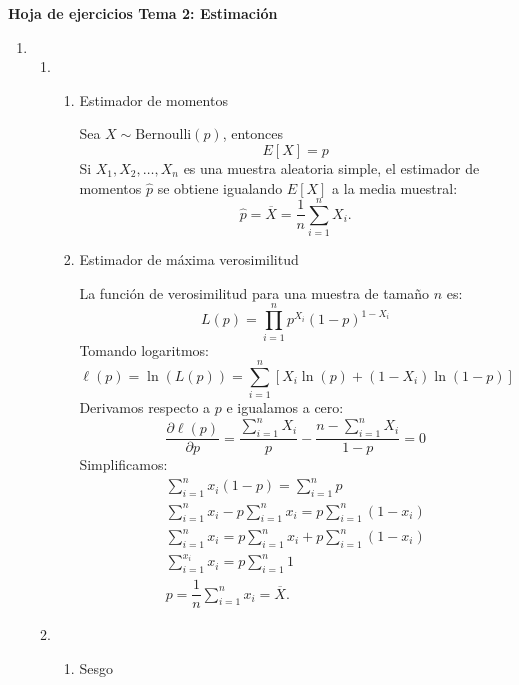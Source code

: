 \begin{center}
    \textbf{\large Hoja de ejercicios Tema 2: Estimación} 
\end{center}
\begin{enumerate}[label=\color{red}\textbf{\arabic*)}]
    \item {}
        \begin{enumerate}[label=\color{red}\textbf{\alph*)}]
            \item {}
                \begin{enumerate}[label=\arabic*)]
                    \item Estimador de momentos

                        Sea $X\sim \mathrm{Bernoulli}(p)$, entonces \[
                            E[X]=p
                        \] 
                        Si $X_1,X_2,\dots,X_n$ es una muestra aleatoria simple, el estimador de momentos  $\hat{p}$ se obtiene igualando $E[X]$ a la media muestral:  \[
                        \hat{p}=\overline{X}=\dfrac{1}{n}\sum_{i=1}^{n} X_i.
                        \] 
                    \item Estimador de máxima verosimilitud

                        La función de verosimilitud para una muestra de tamaño $n$ es: \[
                        L(p)=\prod_{i=1}^{n} p^{X_i}(1-p)^{1-X_i} 
                        \] 
                        Tomando logaritmos: \[
                            \ell(p)=\ln(L(p))=\sum_{i=1}^{n} [X_i\ln(p)+(1-X_i)\ln(1-p)]
                        \] 
                        Derivamos respecto a $p$ e igualamos a cero: \[
                        \frac{\partial \ell(p)}{\partial p} =\dfrac{\sum_{i=1}^{n} X_i}{p}-\dfrac{n-\sum_{i=1}^{n} X_i}{1-p}=0
                        \] 
                        Simplificamos: \[
                        \begin{array}{c}
                            \sum_{i=1}^{n} x_i(1-p)=\sum_{i=1}^{n} p\\
                            \sum_{i=1}^{n}x_i-p \sum_{i=1}^{n} x_i=p \sum_{i=1}^{n} (1-x_i)\\
                            \sum_{i=1}^{n}x_i =p \sum_{i=1}^{n} x_i+p \sum_{i=1}^{n} (1-x_i)\\
                            \sum_{i=1}^{x_i}x_i= p \sum_{i=1}^{n} 1\\
                            p = \dfrac{1}{n}\sum_{i=1}^{n} x_i=\overline{X}.
                        \end{array}
                        \] 
                \end{enumerate}
            \item {} 
                \begin{enumerate}[label=\arabic*)]
                    \item Sesgo


\end{enumerate}
\end{enumerate}
\end{enumerate}
